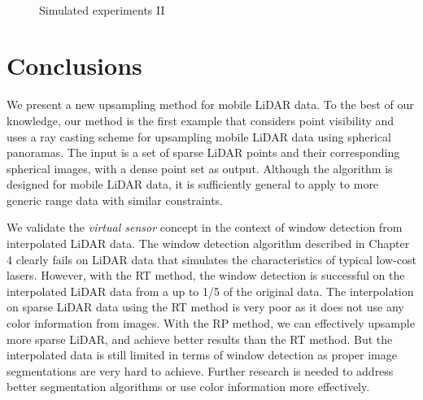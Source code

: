 \begin{figure}[H]
\centering
{} 
\hspace{.1in}
\hspace{.1in}
 \\
\caption{Simulated experiments II} 
\label{fig:C6:SE_RP}
\end{figure} 

\section{Conclusions}

We present a new upsampling method for mobile LiDAR data. To the best of our knowledge, our method is the first example that considers point visibility and uses a ray casting scheme for upsampling mobile LiDAR data using spherical panoramas. The input is a set of sparse LiDAR points and their corresponding spherical images, with a dense point set as output.  Although the algorithm is designed for mobile LiDAR data, it is sufficiently general to apply to more generic range data with similar constraints.  
 
We validate the {\it virtual sensor} concept in the context of window detection from interpolated LiDAR data. The window
detection algorithm described in Chapter 4 clearly fails on LiDAR data that simulates the characteristics of typical low-cost lasers. However, with the RT method, the window detection
is successful on the interpolated LiDAR data from a up to 1/5 
of the original data. The interpolation on sparse LiDAR data using
the RT method is very poor as it does not use any color information from images. With the RP method, we can effectively 
upsample more sparse LiDAR, and achieve better results than the
RT method. But the interpolated data is still limited in terms of window detection as proper image segmentations are very hard to achieve. Further research is needed to address better segmentation algorithms or use color information more effectively.  

